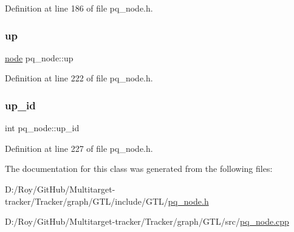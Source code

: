 Definition at line 186 of file pq\+\_\+node.\+h.

\mbox{\label{classpq__node_ae6d5a236397b9a57159487eac7ec168d}} 
\subsubsection{\texorpdfstring{up}{up}}
{\footnotesize\ttfamily \mbox{\hyperlink{classnode}{node}} pq\+\_\+node\+::up\hspace{0.3cm}{\ttfamily [protected]}}



Definition at line 222 of file pq\+\_\+node.\+h.

\mbox{\label{classpq__node_a5a7bcdde1f57191a77a6a14994b38a50}} 
\subsubsection{\texorpdfstring{up\+\_\+id}{up\_id}}
{\footnotesize\ttfamily int pq\+\_\+node\+::up\+\_\+id\hspace{0.3cm}{\ttfamily [protected]}}



Definition at line 227 of file pq\+\_\+node.\+h.



The documentation for this class was generated from the following files\+:\begin{DoxyCompactItemize}
\item 
D\+:/\+Roy/\+Git\+Hub/\+Multitarget-\/tracker/\+Tracker/graph/\+G\+T\+L/include/\+G\+T\+L/\mbox{\hyperlink{pq__node_8h}{pq\+\_\+node.\+h}}\item 
D\+:/\+Roy/\+Git\+Hub/\+Multitarget-\/tracker/\+Tracker/graph/\+G\+T\+L/src/\mbox{\hyperlink{pq__node_8cpp}{pq\+\_\+node.\+cpp}}\end{DoxyCompactItemize}
